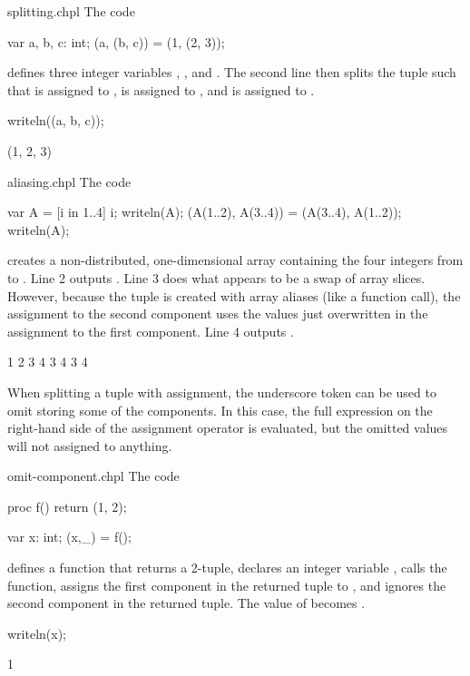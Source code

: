 \begin{chapelexample}{splitting.chpl}
The code
\begin{chapel}
var a, b, c: int;
(a, (b, c)) = (1, (2, 3));
\end{chapel}
defines three integer variables , , and .  The
second line then splits the tuple  such that 
is assigned to ,  is assigned to ,
and  is assigned to .
\begin{chapelpost}
writeln((a, b, c));
\end{chapelpost}
\begin{chapeloutput}
(1, 2, 3)
\end{chapeloutput}
\end{chapelexample}

\begin{chapelexample}{aliasing.chpl}
The code
\begin{chapel}
var A = [i in 1..4] i;
writeln(A);
(A(1..2), A(3..4)) = (A(3..4), A(1..2));
writeln(A);
\end{chapel}
creates a non-distributed, one-dimensional array containing the four
integers from  to .  Line 2 outputs .
Line 3 does what appears to be a swap of array slices.  However,
because the tuple is created with array aliases (like a function
call), the assignment to the second component uses the values just
overwritten in the assignment to the first component.  Line 4
outputs .
\begin{chapelpost}
\end{chapelpost}
\begin{chapeloutput}
1 2 3 4
3 4 3 4
\end{chapeloutput}
\end{chapelexample}

When splitting a tuple with assignment, the underscore token can
be used to omit storing some of the components.  In this case, the
full expression on the right-hand side of the assignment operator is
evaluated, but the omitted values will not assigned to anything.

\begin{chapelexample}{omit-component.chpl}
The code
\begin{chapel}
proc f()
  return (1, 2);

var x: int;
(x,_) = f();
\end{chapel}
defines a function that returns a 2-tuple, declares an integer
variable , calls the function, assigns the first component in
the returned tuple to , and ignores the second component in
the returned tuple.  The value of  becomes .
\begin{chapelpost}
writeln(x);
\end{chapelpost}
\begin{chapeloutput}
1
\end{chapeloutput}
\end{chapelexample}

